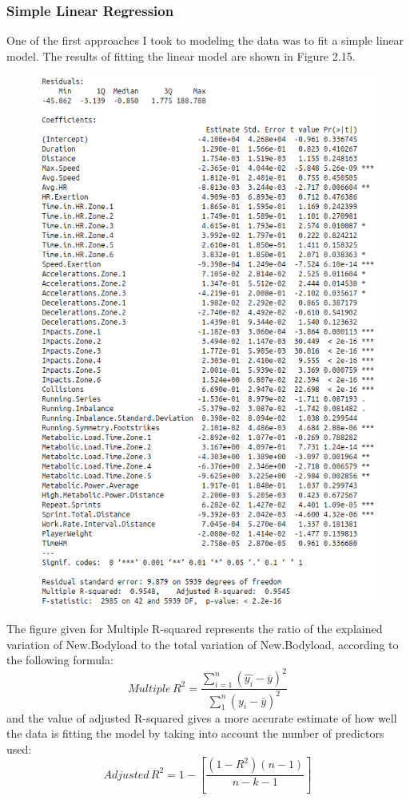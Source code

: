 \subsubsection{Simple Linear Regression}
One of the first approaches I took to modeling the data was to fit a simple linear model. The results of fitting the linear model are shown in Figure 2.15. 
\begin{figure}
	\centering
	\includegraphics[width=.9\linewidth]{Images/SimpleRegressionOutput.png}
\end{figure}
The figure given for Multiple R-squared represents the ratio of the explained variation of New.Bodyload to the total variation of New.Bodyload, according to the following formula:
\[
Multiple \,  R^2=\frac{\sum_{i=1}^{n}(\hat{y_i}-\bar{y})^2}{\sum_{1}^{n}(y_i-\bar{y})^2} 
\]
and the value of adjusted R-squared gives a more accurate estimate of how well the data is fitting the model by taking into account the number of predictors used:
\[
Adjusted \, R^2=1-[\frac{(1-R^2)(n-1)}{n-k-1}]
\]

